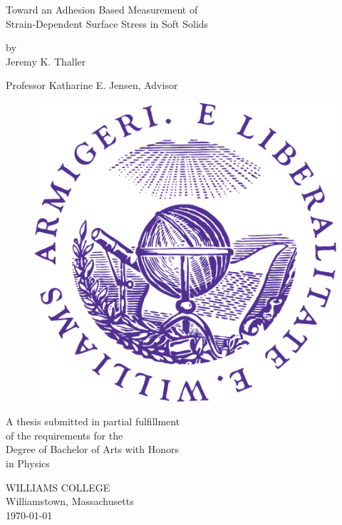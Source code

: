 \documentclass[12pt, oneside]{book}
\newcommand\blankpage{%
	\null
	\thispagestyle{empty}%
	\addtocounter{page}{-1}%
	\newpage}
\begin{document}
\begin{titlepage}
\begin{center}

\vspace*{.5cm}

{\huge Toward an Adhesion Based Measurement of \\\vspace{.4em} Strain-Dependent Surface Stress in Soft Solids} %

\vspace{2cm}

{\large by\\\vspace{.25em}Jeremy K. Thaller}

\vspace{2cm}
{Professor Katharine E. Jensen, Advisor}

\begin{figure}[h]
	\vspace{.5cm}
	\centering
	\includegraphics[width=.25\textwidth]{Chapters/Figures/seal.PNG}
\end{figure}  

\vfill

A thesis submitted in partial fulfillment\\
of the requirements for the\\
Degree of Bachelor of Arts with Honors\\
in Physics

\vspace*{3cm}

WILLIAMS COLLEGE\\
Williamstown, Massachusetts\\
\today %
\end{center}
\end{titlepage}
\afterpage{\blankpage}
\frontmatter 
\end{document}
